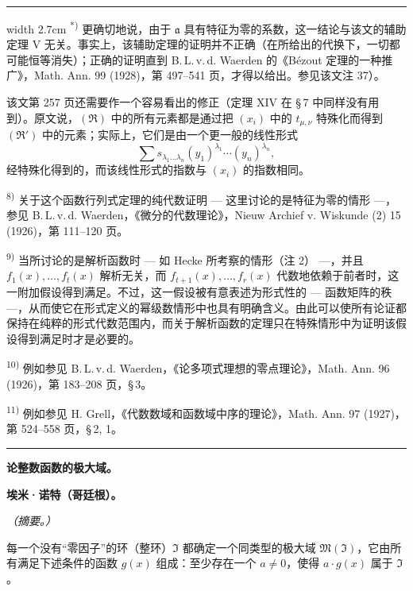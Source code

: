 \documentclass[11pt]{article}
\begin{document}
{\medskip
\hrule width 2.7cm
\smallskip
\noindent\textsuperscript{*)} 更确切地说，由于 $\mathfrak{a}$ 具有特征为零的系数，这一结论与该文的辅助定理 V 无关。事实上，该辅助定理的证明并不正确（在所给出的代换下，一切都可能恒等消失）；正确的证明直到 B.\,L.\,v.\,d. Waerden 的《Bézout 定理的一种推广》，Math. Ann. 99 (1928)，第 497--541 页，才得以给出。参见该文注 37）。

该文第 257 页还需要作一个容易看出的修正（定理 XIV 在 \S\,7 中同样没有用到）。原文说，$(\mathfrak{R})$ 中的所有元素都是通过把 $(x_i)$ 中的 $t_{\mu,\nu}$ 特殊化而得到 $(\mathfrak{R}')$ 中的元素；实际上，它们是由一个更一般的线性形式
\[
\sum s_{\lambda_1\ldots\lambda_n}(y_1)^{\lambda_1}\cdots(y_n)^{\lambda_n},
\]
经特殊化得到的，而该线性形式的指数与 $(x_i)$ 的指数相同。

\noindent\textsuperscript{8)} 关于这个函数行列式定理的纯代数证明 --- 这里讨论的是特征为零的情形 ---，参见 B.\,L.\,v.\,d. Waerden，《微分的代数理论》，Nieuw Archief v. Wiskunde (2) 15 (1926)，第 111--120 页。

\noindent\textsuperscript{9)} 当所讨论的是解析函数时 --- 如 Hecke 所考察的情形（注 2） ---，并且 $f_1(x),\ldots,f_t(x)$ 解析无关，而 $f_{t+1}(x),\ldots,f_r(x)$ 代数地依赖于前者时，这一附加假设得到满足。不过，这一假设被有意表述为形式性的 --- 函数矩阵的秩 ---，从而使它在形式定义的幂级数情形中也具有明确含义。由此可以使所有论证都保持在纯粹的形式代数范围内，而关于解析函数的定理只在特殊情形中为证明该假设得到满足时才是必要的。

\noindent\textsuperscript{10)} 例如参见 B.\,L.\,v.\,d. Waerden，《论多项式理想的零点理论》，Math. Ann. 96 (1926)，第 183--208 页，\S\,3。

\noindent\textsuperscript{11)} 例如参见 H. Grell，《代数数域和函数域中序的理论》，Math. Ann. 97 (1927)，第 524--558 页，\S\,2, 1。
}

\bigskip
\begin{center}\rule{4cm}{0.4pt}\end{center}
\begingroup
{}
\begin{center}
{\Large\bfseries 论整数函数的极大域。}\par
\vspace{0.7em}
{\bfseries 埃米·诺特（哥廷根）。}\par
\vspace{0.5em}
\emph{（摘要。）}
\end{center}

每一个没有“零因子”的环（整环）$\mathfrak{I}$ 都确定一个同类型的极大域 $\mathfrak{M}(\mathfrak{I})$，它由所有满足下述条件的函数 $g(x)$ 组成：至少存在一个 $a\ne0$，使得 $a\cdot g(x)$ 属于 $\mathfrak{I}$。
\end{document}
